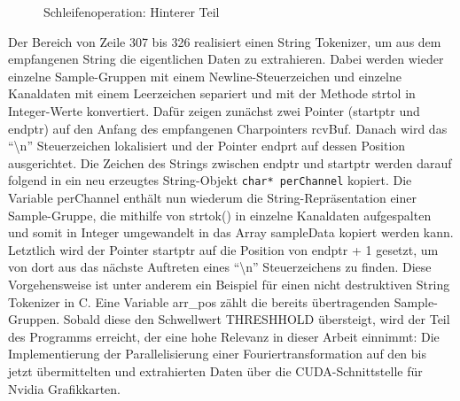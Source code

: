 \begin{figure}[h!]
	
	
	
	
	\caption{Schleifenoperation: Hinterer Teil}
	\label{fig:whileFirst}
\end{figure}

Der Bereich von Zeile 307 bis 326 realisiert einen String Tokenizer, um aus dem empfangenen String die eigentlichen Daten zu extrahieren. Dabei werden wieder einzelne Sample-Gruppen mit einem Newline-Steuerzeichen und einzelne Kanaldaten mit einem Leerzeichen separiert und mit der Methode strtol in Integer-Werte konvertiert.
Dafür zeigen zunächst zwei Pointer (startptr und endptr) auf den Anfang des empfangenen Charpointers rcvBuf. Danach wird das \enquote{\textbackslash n} Steuerzeichen lokalisiert und der Pointer endprt auf dessen Position ausgerichtet. Die Zeichen des Strings zwischen endptr und startptr werden darauf folgend in ein neu erzeugtes String-Objekt \texttt{char* perChannel} kopiert. Die Variable perChannel enthält nun wiederum die String-Repräsentation einer Sample-Gruppe, die mithilfe von strtok() in einzelne Kanaldaten aufgespalten und somit in Integer umgewandelt in das Array sampleData kopiert werden kann. Letztlich wird der Pointer startptr auf die Position von endptr + 1 gesetzt, um von dort aus das nächste Auftreten eines \enquote{\textbackslash n} Steuerzeichens zu finden. Diese Vorgehensweise ist unter anderem ein Beispiel für einen nicht destruktiven String Tokenizer in C. Eine Variable arr\_pos zählt die bereits übertragenden Sample-Gruppen. Sobald diese den Schwellwert THRESHHOLD übersteigt, wird der Teil des Programms erreicht, der eine hohe Relevanz in dieser Arbeit einnimmt: Die Implementierung der Parallelisierung einer Fouriertransformation auf den bis jetzt übermittelten und extrahierten Daten über die CUDA-Schnittstelle für Nvidia Grafikkarten.

